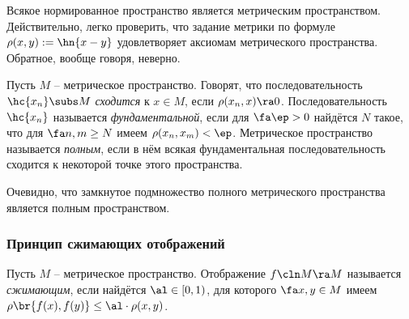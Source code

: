 \documentclass[a4paper]{article}
\begin{document}
\begin{note}
Всякое нормированное пространство является метрическим пространством. Действительно,
легко проверить, что задание метрики по формуле $\rho(x,y) := \hn{x - y}$ удовлетворяет
аксиомам метрического пространства. Обратное, вообще говоря, неверно.
\end{note}

\begin{df}
Пусть $M$ -- метрическое пространство.
Говорят, что последовательность $\hc{x_n} \subs M$ \emph{сходится} к $x \in M$, если $\rho(x_n,x) \ra 0$.
Последовательность $\hc{x_n}$ называется \emph{фундаментальной}, если для $\fa \ep > 0$ найдётся $N$
такое, что для $\fa n,m\ge N$ имеем $\rho(x_n,x_m) < \ep$.
Метрическое пространство называется \emph{полным}, если в нём всякая фундаментальная последовательность
сходится к некоторой точке этого пространства.
\end{df}

Очевидно, что замкнутое подмножество полного метрического пространства является полным пространством.

\subsubsection{Принцип сжимающих отображений}

\begin{df}
Пусть $M$ -- метрическое пространство. Отображение $f\cln M \ra M$ называется \emph{сжимающим},
если найдётся $\al \in [0,1)$, для которого $\fa x, y \in M$ имеем $\rho\br{f(x),f(y)} \le \al\cdot \rho(x,y)$.
\end{df}
\end{document}
